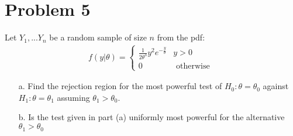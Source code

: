\documentclass{article}
\begin{document}
\section*{Problem 5}
Let $Y_1,...Y_n$ be a random sample of size $n$ from the pdf:
\begin{align*}
f(y|\theta) =
\begin{cases} 
      \frac{1}{2\theta^3} y^2 e^{-\frac{y}{\theta}} & y>0 \\
      0 & \text{ otherwise  }
   \end{cases}
\end{align*}
\begin{enumerate}
\item[a.] Find the rejection region for the most powerful test of $H_0: \theta = \theta_0$ against $H_1:\theta=\theta_1$ assuming $\theta_1>\theta_0$.
\item[b.]  Is the test given in part (a) uniformly most powerful for the alternative $\theta_1 > \theta_0$
\end{enumerate}
\end{document}
